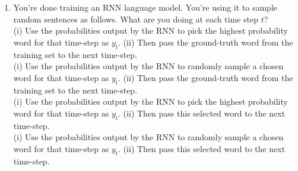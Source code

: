\begin{enumerate}
    \item You're done training an RNN language model. You're using it to sample random sentences as follows. What are you doing at each time step $t$? \\ 
        \hspace{1cm}\choice{}  (i) Use the probabilities output by the RNN to pick the highest probability word for that time-step as $y_t$. (ii) Then pass the ground-truth word from the training set to the next time-step. \\ 
        \hspace{1cm}\choice{}  (i) Use the probabilities output by the RNN to randomly sample a chosen word for that time-step as $y_t$. (ii) Then pass the ground-truth word from the training set to the next time-step. \\ 
        \hspace{1cm}\choice{}  (i) Use the probabilities output by the RNN to pick the highest probability word for that time-step as $y_t$. (ii) Then pass this selected word to the next time-step. \\ 
        \hspace{1cm}\checkmark  (i) Use the probabilities output by the RNN to randomly sample a chosen word for that time-step as $y_t$. (ii) Then pass this selected word to the next time-step.

        \solution{}


\end{enumerate}
